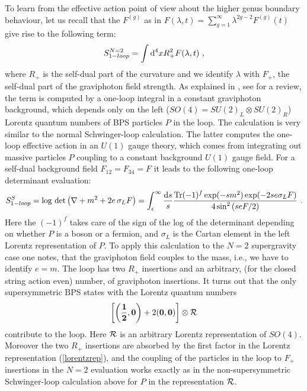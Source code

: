 \documentclass[12pt]{article}
\newcommand{\ds}{\displaystyle}
\begin{document}
To learn from  the effective action point of view about the higher
genus boundary behaviour, let us recall that the $F^{(g)}$ as in
$F(\lambda,t)=\sum_{g=1}^\infty \lambda^{2g-2} F^{(g)}(t)$ give
rise to the following term:
\begin{equation}
S^{N=2}_{1-loop}=\int {\rm d}^4 x R_+^2 F(\lambda ,t)\ ,
\label{N=2oneloop}
\end{equation}
where $R_+$ is the self-dual part of the curvature and we identify
$\lambda$ with $F_+$, the self-dual part of the graviphoton field
strength. As explained in \cite{GVI,GVII}, see \cite{MB} for a
review, the term is computed by a one-loop integral in a constant
graviphoton background, which depends only on the left
($SO(4)=SU(2)_L\otimes SU(2)_R$) Lorentz quantum numbers of BPS
particles $P$ in the loop. The calculation is very similar to the
normal Schwinger-loop calculation. The latter computes the
one-loop effective action in an $U(1)$ gauge theory, which comes
from integrating out massive particles $P$ coupling to a constant
background $U(1)$ gauge field. For a self-dual background field
$F_{12}=F_{34}=F$ it leads to the following one-loop determinant
evaluation:
\begin{equation}
S^{S}_{1-loop}=\log\, \det \left(\nabla + m^2 + 2 e \, \sigma_L F\right)=
\int_{\epsilon}^\infty \frac{{\rm d} s}{s} \ds{{ {\rm Tr} (-1)^f \exp({- s m^2 }) \exp({-2 s e \sigma_L F})}\over
4 \sin^2\ds{\left( s e F/2\right)}}\ .
\label{schwingerloop}
\end{equation}
Here the $(-1)^f$ takes care of the sign of the log of the
determinant depending on whether $P$ is a boson or a fermion, and
$\sigma_L$ is the Cartan element in the left Lorentz
representation of $P$. To apply this calculation to the $N=2$
supergravity case one notes, that the graviphoton field couples
to the mass, i.e., we have to identify $e=m$. The loop has two
$R_+$ insertions and an arbitrary, (for the closed string action
even) number, of graviphoton insertions. It turns out \cite{GVII}
that the only supersymmetric BPS states with the Lorentz quantum
numbers
\begin{equation}
\left[\left({\bf\frac{1}{2}},{\bf 0}\right)+2({\bf 0},{\bf 0})\right]\otimes {\cal R}
\label{lorentzrep}
\end{equation}
contribute to the loop. Here  ${\cal R}$ is an arbitrary Lorentz
representation of $SO(4)$. Moreover the two $R_+$ insertions are
absorbed by the first factor in the Lorentz representation
(\ref{lorentzrep}), and the coupling of the particles in the loop
to $F_+$ insertions in the $N=2$ evaluation works exactly  as in
the non-supersymmetric Schwinger-loop calculation above for $P$ in
the representation ${\cal R}$.
\end{document}
